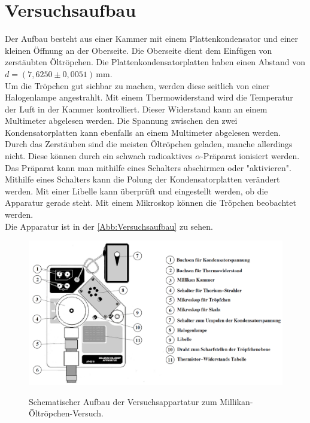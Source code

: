 \section{Versuchsaufbau}
\label{sec:Versuchsaufbau}

Der Aufbau besteht aus einer Kammer mit einem Plattenkondensator und einer kleinen
Öffnung an der Oberseite. Die Oberseite dient dem Einfügen von zerstäubten Öltröpchen.
Die Plattenkondensatorplatten haben einen Abstand von $d = (7,6250 \pm 0,0051) \, \si{\milli\meter}$.\\
Um die Tröpchen gut sichbar zu machen, werden diese seitlich von einer Halogenlampe 
angestrahlt. Mit einem Thermowiderstand wird die Temperatur der Luft in der Kammer 
kontrolliert. Dieser Widerstand kann an einem Multimeter abgelesen werden. Die Spannung
zwischen den zwei Kondensatorplatten kann ebenfalls an einem Multimeter abgelesen werden.\\
Durch das Zerstäuben sind die meisten Öltröpchen geladen, manche allerdings nicht. Diese
können durch ein schwach radioaktives $\alpha$-Präparat ionisiert werden. Das Präparat kann
man mithilfe eines Schalters abschirmen oder "aktivieren".\\
Mithilfe eines Schalters kann die Polung der Kondensatorplatten verändert werden. Mit einer
Libelle kann überprüft und eingestellt werden, ob die Apparatur gerade steht. Mit einem
Mikroskop können die Tröpchen beobachtet werden.\\
Die Apparatur ist in der \autoref{Abb:Versuchsaufbau} zu sehen.

\begin{figure}[H]
    \centering
    
    \caption{Schematischer Aufbau der Versuchsappartatur zum Millikan-Öltröpchen-Versuch.\cite{sample}}
    \includegraphics[width=\textwidth]{bilder/Versuchsaufbau.png}
    \label{Abb:Versuchsaufbau}
\end{figure}

